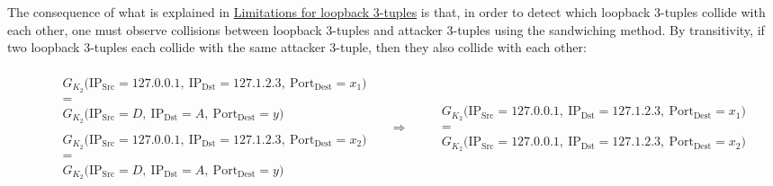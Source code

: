 \documentclass{report}
\begin{document}
The consequence of what is explained in \hyperlink{limitations}{Limitations for loopback 3-tuples} is that, in order to detect which loopback 3-tuples collide with each other, one must observe \alert{collisions between loopback 3-tuples and attacker 3-tuples} using the sandwiching method. By transitivity, if two loopback 3-tuples each collide with the same attacker 3-tuple, then they also collide with each other:
\begin{center}
	\begin{adjustbox}{scale=0.9}
		\begin{minipage}{1.1\textwidth}
			\[
				\begin{aligned}
					 &
					\begin{aligned}
						 & \begin{array}{c}
							   G_{K_2}\bigl(\text{IP}_{\text{Src}} = 127.0.0.1,\ \text{IP}_{\text{Dst}} = 127.1.2.3,\ \text{Port}_{\text{Dest}} = x_1 \bigr) \\[0.3em]
							   =                                                                                                                             \\[0.3em]
							   G_{K_2}\bigl(\text{IP}_{\text{Src}} = D,\ \text{IP}_{\text{Dst}} = A,\ \text{Port}_{\text{Dest}} = y \bigr)
						   \end{array}
						\\[1em]
						 & \begin{array}{c}
							   G_{K_2}\bigl(\text{IP}_{\text{Src}} = 127.0.0.1,\ \text{IP}_{\text{Dst}} = 127.1.2.3,\ \text{Port}_{\text{Dest}} = x_2 \bigr) \\[0.3em]
							   =                                                                                                                             \\[0.3em]
							   G_{K_2}\bigl(\text{IP}_{\text{Src}} = D,\ \text{IP}_{\text{Dst}} = A,\ \text{Port}_{\text{Dest}} = y \bigr)
						   \end{array}
					\end{aligned}
					\quad \Longrightarrow \quad
					\begin{aligned}
						 & \begin{array}{c}
							   G_{K_2}\bigl(\text{IP}_{\text{Src}} = 127.0.0.1,\ \text{IP}_{\text{Dst}} = 127.1.2.3,\ \text{Port}_{\text{Dest}} = x_1 \bigr) \\[0.3em]
							   =                                                                                                                             \\[0.3em]
							   G_{K_2}\bigl(\text{IP}_{\text{Src}} = 127.0.0.1,\ \text{IP}_{\text{Dst}} = 127.1.2.3,\ \text{Port}_{\text{Dest}} = x_2 \bigr)
						   \end{array}
					\end{aligned}
				\end{aligned}
			\]
		\end{minipage}
	\end{adjustbox}
\end{center}
\end{document}
